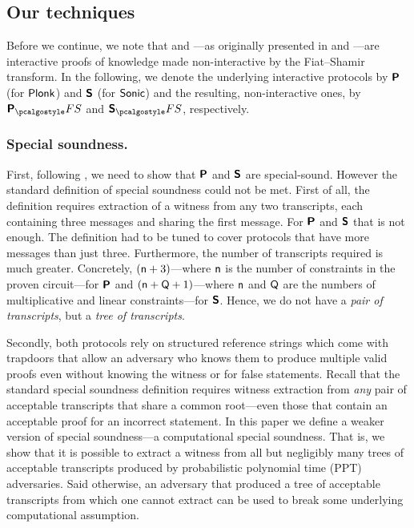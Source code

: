 \documentclass[runningheads,11pt]{llncs}
\theoremstyle{definition} \newtheorem{definition}[theorem]{Definition}
\begin{document}
\subsection{Our techniques}

Before we continue, we note that \plonk{} and \sonic{}---as originally presented
in \cite{EPRINT:GabWilCio19} and \cite{CCS:MBKM19}---are interactive proofs of
knowledge made non-interactive by the Fiat--Shamir transform. In the following,
we denote the underlying interactive protocols by $\bm{\mathsf{P}}$ (for $\textnormal{\textsf{Plonk}}$)
and $\bm{\mathsf{S}}$ (for ${\textnormal{\textsf{Sonic}}}$) and the resulting, non-interactive ones, by
$\plonkprotfs$ and $\sonicprotfs$, respectively.

\subsubsection{Special soundness.} 
First, following \cite{INDOCRYPT:FKMV12}, we need to show that $\bm{\mathsf{P}}$ and
$\bm{\mathsf{S}}$ are special-sound. However the standard definition of special
soundness could not be met. First of all, the definition requires extraction of
a witness from any two transcripts, each containing three messages and sharing
the first message. For $\bm{\mathsf{P}}$ and $\bm{\mathsf{S}}$ that is not enough. The
definition had to be tuned to cover protocols that have more messages than just
three. Furthermore, the number of transcripts required is much
greater. Concretely, $(\mathsf{n} + 3)$---where $\mathsf{n}$ is the
number of constraints in the proven circuit---for $\bm{\mathsf{P}}$ and $(\mathsf{n}
+ \mathsf{Q} + 1)$---where $\mathsf{n}$ and $\mathsf{Q}$ are the numbers of
multiplicative and linear constraints---for $\bm{\mathsf{S}}$. Hence, we do not have
a \emph{pair of transcripts}, but a \emph{tree of transcripts}.

Secondly, both protocols rely on structured reference strings which come with
trapdoors that allow an adversary who knows them to produce multiple valid
proofs even without knowing the witness or for false statements. Recall that the
standard special soundness definition requires witness extraction from
\emph{any} pair of acceptable transcripts that share a common root---even those
that contain an acceptable proof for an incorrect statement. In this paper we
define a weaker version of special soundness---a computational special
soundness. That is, we show that it is possible to extract a witness from all
but negligibly many trees of acceptable transcripts produced by probabilistic
polynomial time (PPT) adversaries. Said otherwise, an adversary that produced a
tree of acceptable transcripts from which one cannot extract can be used to
break some underlying computational assumption.
\end{document}
